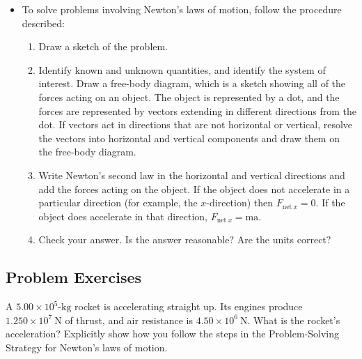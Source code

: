 \documentclass[
]{book}
\providecommand{\tightlist}{%
  \setlength{\itemsep}{0pt}\setlength{\parskip}{0pt}}
\begin{document}
\begin{itemize}
\tightlist
\item
  \protect\hypertarget{import-auto-id1655645}{}{To solve problems involving Newton's laws of motion, follow the
  procedure described:}

  \begin{enumerate}
  \def\labelenumi{\arabic{enumi}.}
  \tightlist
  \item
    \protect\hypertarget{import-auto-id1435944}{}{Draw a sketch of the problem.}
  \item
    \protect\hypertarget{import-auto-id1304011}{}{Identify known and unknown quantities, and identify the system
    of interest. Draw a free-body diagram, which is a sketch showing
    all of the forces acting on an object. The object is represented
    by a dot, and the forces are represented by vectors extending in
    different directions from the dot. If vectors act in directions
    that are not horizontal or vertical, resolve the vectors into
    horizontal and vertical components and draw them on the
    free-body diagram.}
  \item
    \protect\hypertarget{import-auto-id2638784}{}{Write Newton's second law in the horizontal and vertical
    directions and add the forces acting on the object. If the
    object does not accelerate in a particular direction (for
    example, the \(x{}\)-direction) then \({F_{\text{net}\ x} = 0}{}\).
    If the object does accelerate in that direction,
    \({F_{\text{net}\ x} = \text{ma}}{}\).}
  \item
    \protect\hypertarget{import-auto-id2664631}{}{Check your answer. Is the answer reasonable? Are the units
    correct?}
  \end{enumerate}
\end{itemize}

\hypertarget{fs-id2328021}{}
\hypertarget{problem-exercises-3}{%
\subsection{Problem Exercises}\label{problem-exercises-3}}

\hypertarget{fs-id1250439}{}
\leavevmode{}%
A \({5\text{.}{\text{00} \times \text{10}^{5}}\text{-kg}}{}\) rocket is
accelerating straight up. Its engines produce
\({1\text{.}{\text{250} \times \text{10}^{7}\ }\text{N}}{}\) of thrust,
and air resistance is
\({4\text{.}{\text{50} \times \text{10}^{6}}\ \text{N}}{}\). What is the
rocket's acceleration? Explicitly show how you follow the steps in the
Problem-Solving Strategy for Newton's laws of motion.
\end{document}
